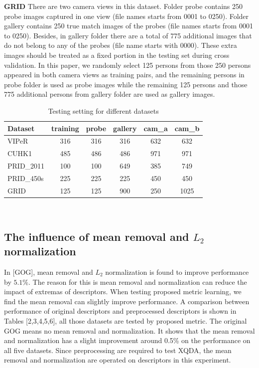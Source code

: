 \documentclass[conference,compsoc]{IEEEtran}
\begin{document}
\textbf{GRID} There are two camera views in this dataset. Folder probe contains 250 probe images captured in one view (file names starts from 0001  to 0250). Folder gallery contains 250 true match images of the probes (file names starts from 0001  to 0250). Besides, in gallery folder there are a total of 775 additional images that do not belong to any of the probes (file name starts with 0000). These extra images should be treated as a fixed portion in the testing set during cross validation. In this paper, we randomly select 125 persons from those 250 persons appeared in both camera views as training pairs, and the remaining persons in probe folder is used as probe images while  the remaining 125 persons and those 775 additional persons from gallery folder are used as gallery images. \\
\begin{table}
\caption{Testing setting for different datasets}
\centering
\begin{tabular}{|l|c|c|c|c|c|}
\hline
Dataset&training&probe&gallery&cam\_a&cam\_b\\
\hline
VIPeR&316&316&316&632&632\\
\hline
CUHK1&485&486&486&971&971\\
\hline
PRID\_2011&100&100&649&385&749\\
\hline
PRID\_450s&225&225&225&450&450\\
\hline
GRID&125&125&900&250&1025\\
\hline
\end{tabular}\\ 
\end{table}
\subsection{The influence of mean removal and $L_2$ normalization}
In [GOG], mean removal and $L_2$  normalization is found to improve performance by $5.1\%$. The reason for this is mean removal and normalization can reduce the impact of extremas of descriptors. When testing proposed metric learning, we find the mean removal can slightly improve performance. A comparison between performance of original descriptors and preprocessed descriptors is shown in Tables [2,3,4,5,6], all those datasets are tested by proposed metric. The original GOG means no mean removal and normalization. It shows that the mean removal and normalization has a slight improvement around 0.5\% on the performance on all five datasets. Since preprocessing are required to test XQDA, the mean removal and normalization are operated on descriptors in this experiment. 
\end{document}
